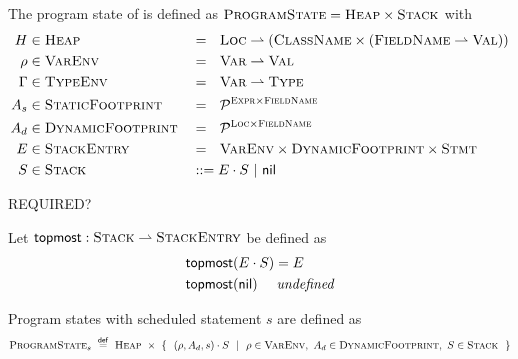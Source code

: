 The program state of \svl is defined as $\textsc{ProgramState} = \textsc{Heap} \times \textsc{Stack}$ with
\begin{align*}
	H      & \in \textsc{Heap}       &  & =~~ \textsc{Loc} \rightharpoonup (\textsc{ClassName} \times (\textsc{FieldName} \rightharpoonup \textsc{Val})) \\
	\rho   & \in \textsc{VarEnv}     &  & =~~ \textsc{Var} \rightharpoonup \textsc{Val}                                                        \\
	\Gamma & \in \textsc{TypeEnv}    &  & =~~ \textsc{Var} \rightharpoonup \textsc{Type}                                                       \\
	A_s    & \in \textsc{StaticFootprint} &  & =~~ \mathcal{P}^{\textsc{Expr} \times \textsc{FieldName}}                                                    \\
	A_d    & \in \textsc{DynamicFootprint} &  & =~~ \mathcal{P}^{\textsc{Loc} \times \textsc{FieldName}}                                                     \\
	E      & \in \textsc{StackEntry} &  & =~~ \textsc{VarEnv} \times \textsc{DynamicFootprint} \times \textsc{Stmt}                                       \\
	S      & \in \textsc{Stack}      &  & ::= E \cdot S ~|~ \textup{\textsf{nil}}
\end{align*}

REQUIRED?
\begin{definition}
    Let $\textup{\textsf{topmost}} : \textsc{Stack} \rightharpoonup \textsc{StackEntry}$ be defined as
    \begin{align*}
    &\textup{\textsf{topmost}}(E \cdot S) = E\\
    &\textup{\textsf{topmost}}(\textup{\textsf{nil}}) \quad\textit{ undefined}
    \end{align*}
\end{definition}




Program states with scheduled statement $s$ are defined as
\begin{displaymath}
\textsc{ProgramState}_s ~\overset{\textup{\textsf{def}}}{=}~ \textsc{Heap} ~\times~ \{~~ (\rho, A_d, s) \cdot S ~~|~~ \rho \in \textsc{VarEnv},~ A_d \in \textsc{DynamicFootprint},~ S \in \textsc{Stack} ~~\}
\end{displaymath}
